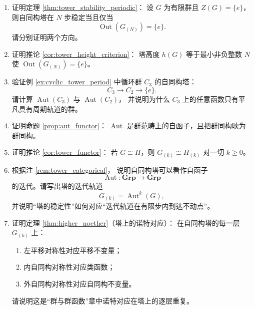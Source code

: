 \begin{enumerate}[leftmargin=3em, label=\textbf{题 \arabic*}]
    \item 证明定理 \ref{thm:tower_stability_periodic}：
    设 $G$ 为有限群且 $Z(G)=\{e\}$，
    则自同构塔在 $N$ 步稳定当且仅当
    \[
    \operatorname{Out}(G_{(N)})=\{e\}.
    \]
    请分别证明两个方向。

    \item 证明推论 \ref{cor:tower_height_criterion}：
    塔高度 $h(G)$ 等于最小非负整数 $N$ 使 $\operatorname{Out}(G_{(N)})=\{e\}$。

    \item 验证例 \ref{ex:cyclic_tower_period} 中循环群 $C_3$ 的自同构塔：
    \[
    C_3\to C_2\to\{e\}.
    \]
    请计算 $\operatorname{Aut}(C_3)$ 与 $\operatorname{Aut}(C_2)$，
    并说明为什么 $C_3$ 上的任意函数只有平凡具有周期轨道的群。

    \item 证明命题 \ref{prop:aut_functor}：
    $\operatorname{Aut}$ 是群范畴上的自函子，且把群同构映为群同构。

    \item 证明推论 \ref{cor:tower_functor}：
    若 $G\cong H$，则 $G_{(k)}\cong H_{(k)}$ 对一切 $k\ge 0$。

    \item 根据注 \ref{rem:tower_categorical}，
    说明自同构塔可以看作自函子
    \[
    \operatorname{Aut}:\mathbf{Grp}\to\mathbf{Grp}
    \]
    的迭代。请写出塔的迭代轨道
    \[
    G_{(k)}=\operatorname{Aut}^k(G),
    \]
    并说明“塔的稳定性”如何对应“迭代轨道在有限步内到达不动点”。

    \item 证明定理 \ref{thm:higher_noether}（塔上的诺特对应）：
    在自同构塔的每一层 $G_{(k)}$ 上：
    \begin{enumerate}[label=(\roman*)]
        \item 左平移对称性对应平移不变量；
        \item 内自同构对称性对应类函数；
        \item 外自同构对称性对应自同构不变量。
    \end{enumerate}
    请说明这是“群与群函数”章中诺特对应在塔上的逐层重复。


\end{enumerate}

